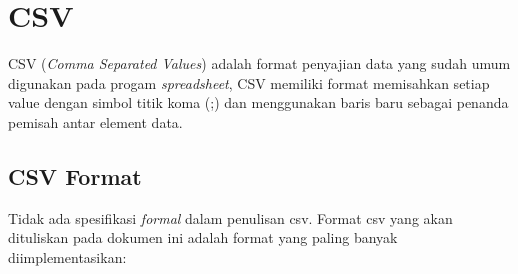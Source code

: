    
\section{CSV}
\label{subsec:csv}
CSV (\textit{Comma Separated Values}) adalah format penyajian data yang sudah umum digunakan pada progam \textit{spreadsheet}, CSV memiliki format memisahkan setiap value dengan simbol titik koma (;) dan menggunakan baris baru sebagai penanda pemisah antar element data\cite{RFC:4180}.

\subsection{CSV Format}
Tidak ada spesifikasi \textit{formal} dalam penulisan csv. Format csv yang akan dituliskan pada dokumen ini adalah format yang paling banyak diimplementasikan:

